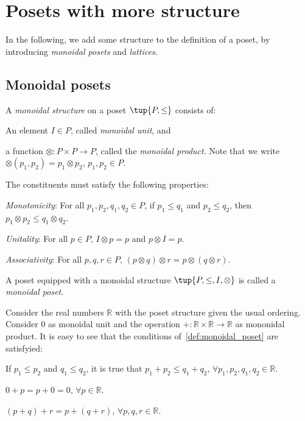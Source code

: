 \section{Posets with more structure}
In the following, we add some structure to the definition of a poset, by introducing \emph{monoidal posets} and \emph{lattices}.
\subsection{Monoidal posets}
\begin{definition}
\label{def:monoidal_poset}
A \emph{monoidal structure} on a poset $\tup{P,\leq}$ consists of:
\begin{compactenum}
    \item An element $I\in P$, called \emph{monoidal unit}, and
    \item a function $\otimes\colon P\times P\to P$, called the \emph{monoidal product}. Note that we write $\otimes(p_1,p_2)=p_1\otimes p_2$, $p_1,p_2\in P$.
\end{compactenum}
The constituents must satisfy the following properties:
\begin{compactenum}[(a)]
    \item \emph{Monotonicity}: For all $p_1,p_2,q_1,q_2\in P$, if $p_1\leq q_1$ and $p_2\leq q_2$, then $p_1\otimes p_2\leq q_1\otimes q_2$.
    \item \emph{Unitality}: For all $p\in P$, $I\otimes p=p$ and $p\otimes I=p$.
    \item \emph{Associativity}: For all $p,q,r\in P$, $(p\otimes q)\otimes r=p\otimes (q\otimes r)$.
\end{compactenum}
A poset equipped with a monoidal structure $\tup{P,\leq,I,\otimes}$ is called a \emph{monoidal poset}.
\end{definition}

\begin{example}
Consider the real numbers $\mathbb{R}$ with the poset structure given the usual ordering. Consider 0 as monoidal unit and the operation $+\colon \mathbb{R}\times \mathbb{R}\to \mathbb{R}$ as mononidal product. It is easy to see that the conditions of~\cref{def:monoidal_poset} are satisfyied:
\begin{compactenum}[(a)]
    \item If $p_1\leq p_2$ and $q_1\leq q_2$, it is true that $p_1+p_2\leq q_1+q_2$, $\forall p_1,p_2,q_1,q_2\in \mathbb{R}$.
    \item $0+p=p+0=0$, $\forall p\in \mathbb{R}$.
    \item $(p+q)+r=p+(q+r)$, $\forall p,q,r\in \mathbb{R}$.
\end{compactenum}
\end{example}
